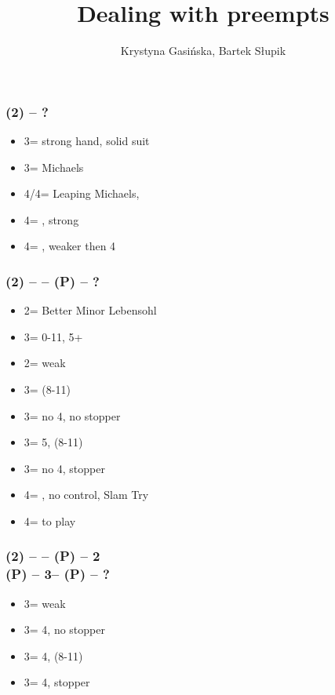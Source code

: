 \documentclass[12pt, a4paper]{article}
\title{Dealing with preempts}
\author{Krystyna Gasińska, Bartek Słupik}
\begin{document}
\maketitle


\subsubsection*{(2\hearts) -- ?}
\begin{itemize}
    \item 3\spades = strong hand, solid suit
    \item 3\hearts = Michaels
    \item 4\clubs/4\diams = Leaping Michaels, \gf
    \item 4\hearts = \minor, strong \vimp
    \item 4\nt = \minor, weaker then 4\hearts
\end{itemize}

\subsubsection*{(2\hearts) -- \dbl -- (P) -- ?}
\begin{itemize}
    \item 2\nt = Better Minor Lebensohl
    \item 3\clubs = 0-11, 5+\clubs
    \item 2\spades = weak
    \item 3\diams = \inv (8-11)
    \item 3\hearts = no 4\spades, no \hearts stopper
    \item 3\spades = 5\spades, \inv (8-11) \imp
    \item 3\nt = no 4\spades, \hearts stopper
    \item 4\hearts = \minor, no \hearts control, Slam Try \vimp
    \item 4\spades = to play
\end{itemize}

\subsubsection*{(2\hearts) -- \dbl -- (P) -- 2\nt \\
                (P) -- 3\mins -- (P) -- ?}
\begin{itemize}
    \item 3\diams = weak
    \item 3\hearts = 4\spades, no \hearts stopper
    \item 3\spades = 4\spades, \inv (8-11) \imp
    \item 3\nt = 4\spades, \hearts stopper
\end{itemize}
\end{document}
